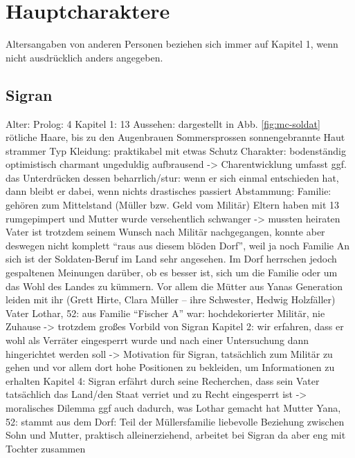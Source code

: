 \chapter{Hauptcharaktere}

Altersangaben von anderen Personen beziehen sich immer auf Kapitel 1, wenn nicht ausdrücklich anders angegeben.

\section{Sigran} \label{sec:mc-soldat}
\begin{outline}
	\1 Alter:
		\2 Prolog: 4
		\2 Kapitel 1: 13
	\1 Aussehen:
		\2 dargestellt in Abb. \ref{fig:mc-soldat}
		\2 rötliche Haare, bis zu den Augenbrauen
		\2 Sommersprossen
		\2 sonnengebrannte Haut
		\2 strammer Typ
	\1 Kleidung:
		\2 praktikabel
		\2 mit etwas Schutz
	\1 Charakter:
		\2 bodenständig 
		\2 optimistisch 
		\2 charmant
		\2 ungeduldig
		\2 aufbrausend -> Charentwicklung umfasst ggf. das Unterdrücken dessen
		\2 beharrlich/stur: wenn er sich einmal entschieden hat, dann bleibt er dabei, wenn nichts drastisches passiert
	\1 Abstammung:
		\2 Familie:
			\3 gehören zum Mittelstand (Müller bzw. Geld vom Militär)
			\3 Eltern haben mit 13 rumgepimpert und Mutter wurde versehentlich schwanger -> mussten heiraten
			\3 Vater ist trotzdem seinem Wunsch nach Militär nachgegangen, konnte aber deswegen nicht komplett "`raus aus diesem blöden Dorf"', weil ja noch Familie
			\3 An sich ist der Soldaten-Beruf im Land sehr angesehen. Im Dorf herrschen jedoch gespaltenen Meinungen darüber, ob es besser ist, sich um die Familie oder um das Wohl des Landes zu kümmern. Vor allem die Mütter aus Yanas Generation leiden mit ihr (Grett Hirte, Clara Müller – ihre Schwester, Hedwig Holzfäller)
		\2 Vater Lothar, 52: 
			\3 aus Familie "`Fischer A"'
			\3 war: hochdekorierter Militär, nie Zuhause -> trotzdem großes Vorbild von Sigran
			\3 Kapitel 2: wir erfahren, dass er wohl als Verräter eingesperrt wurde und nach einer Untersuchung dann hingerichtet werden soll -> Motivation für Sigran, tatsächlich zum Militär zu gehen und vor allem dort hohe Positionen zu bekleiden, um Informationen zu erhalten
			\3 Kapitel 4: Sigran erfährt durch seine Recherchen, dass sein Vater tatsächlich das Land/den Staat verriet und zu Recht eingesperrt ist -> moralisches Dilemma ggf auch dadurch, was Lothar gemacht hat
		\2 Mutter Yana, 52:
			\3 stammt aus dem Dorf: Teil der Müllersfamilie
			\3 liebevolle Beziehung zwischen Sohn und Mutter, praktisch alleinerziehend, arbeitet bei Sigran da aber eng mit Tochter zusammen

\end{outline}
